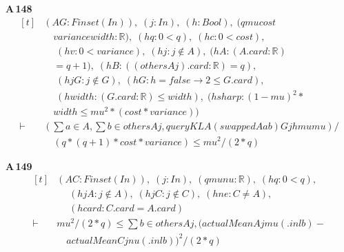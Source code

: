 \noindent\textbf{A\,148}\quad{}
{\footnotesize\[ \begin{aligned}[t]
&(\mathit{A} \mathit{G} : \mathit{Finset} (\mathit{I} \mathit{n})),\; (\mathit{j} : \mathit{I} \mathit{n}),\; (\mathit{h} : \mathit{Bool}),\; (\mathit{q} \mathit{mu} \mathit{cost}\\
&\quad \mathit{variance} \mathit{width} : \mathbb{R} ),\; (\mathit{hq} : 0<\mathit{q}),\; (\mathit{hc} : 0<\mathit{cost}),\\
&\quad \; (\mathit{hv} : 0<\mathit{variance}),\; (\mathit{hj} : \mathit{j} \notin \mathit{A}),\; (\mathit{hA} : (\mathit{A}.\mathit{card}:\mathbb{R} )\\
&\quad =\mathit{q}+1),\; (\mathit{hB} : ((\mathit{others} \mathit{A} \mathit{j}).\mathit{card}:\mathbb{R} )=\mathit{q}),\\
&\quad \; (\mathit{hjG} : \mathit{j} \notin \mathit{G}),\; (\mathit{hG} : \mathit{h}=\mathit{false} \to 2 \leq \mathit{G}.\mathit{card}),\\
&\quad \; (\mathit{hwidth} : (\mathit{G}.\mathit{card}:\mathbb{R} ) \leq \mathit{width}),\; (\mathit{hsharp} : (1-\mathit{mu})^{2}*\\
&\quad \mathit{width} \leq \mathit{mu}^{2}*(\mathit{cost}*\mathit{variance}))\\
\vdash\;&(\textstyle\sum \mathit{a} \in \mathit{A},\textstyle\sum \mathit{b} \in \mathit{others} \mathit{A} \mathit{j},\mathit{queryKL} \mathit{A} (\mathit{swapped} \mathit{A} \mathit{a} \mathit{b}) \mathit{G} \mathit{j} \mathit{h} \mathit{mu} \mathit{mu})/\\
&\quad (\mathit{q}*(\mathit{q}+1)*\mathit{cost}*\mathit{variance}) \leq \mathit{mu}^{2}/(2*\mathit{q})
\end{aligned} \]}

\noindent\textbf{A\,149}\quad{}
{\footnotesize\[ \begin{aligned}[t]
&(\mathit{A} \mathit{C} : \mathit{Finset} (\mathit{I} \mathit{n})),\; (\mathit{j} : \mathit{I} \mathit{n}),\; (\mathit{q} \mathit{mu} \mathit{nu} : \mathbb{R} ),\; (\mathit{hq} : 0<\mathit{q}),\\
&\quad \; (\mathit{hjA} : \mathit{j} \notin \mathit{A}),\; (\mathit{hjC} : \mathit{j} \notin \mathit{C}),\; (\mathit{hne} : \mathit{C} \neq \mathit{A}),\\
&\quad \; (\mathit{hcard} : \mathit{C}.\mathit{card}=\mathit{A}.\mathit{card})\\
\vdash\;&\mathit{mu}^{2}/(2*\mathit{q}) \leq \textstyle\sum \mathit{b} \in \mathit{others} \mathit{A} \mathit{j}, (\mathit{actualMean} \mathit{A} \mathit{j} \mathit{mu} (.\mathit{inl} \mathit{b})-\\
&\quad \mathit{actualMean} \mathit{C} \mathit{j} \mathit{nu} (.\mathit{inl} \mathit{b}))^{2}/(2*\mathit{q})
\end{aligned} \]}

